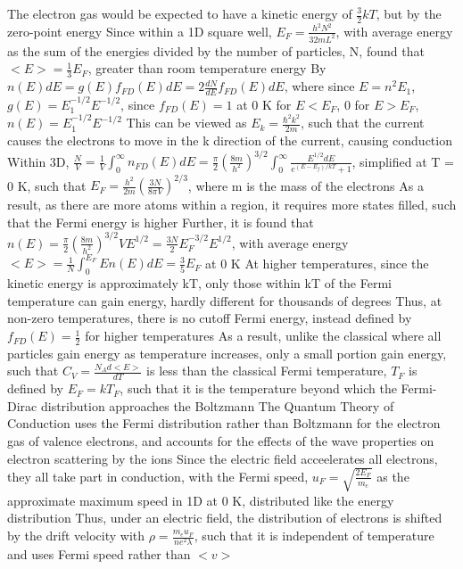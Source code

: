 \documentclass[11 pt, twoside]{article}
\newenvironment{outline*}
{
	\begin{outline}[enumerate]
	}
	{\end{outline}
}
\begin{document}
\begin{outline*}
\1 The electron gas would be expected to have a kinetic energy of $\frac{3}{2}kT$, but by the zero-point energy
	\2 Since within a 1D square well, $E_F = \frac{h^2N^2}{32mL^2}$, with average energy as the sum of the energies divided by the number of particles, N, found that $<E> = \frac{1}{3}E_F$, greater than room temperature energy
		\3 By $n(E)dE = g(E)f_{FD}(E)dE = 2\frac{dN}{dE}f_{FD}(E)dE$, where since $E = n^2E_1$, $g(E) = E_1^{-1/2}E^{-1/2}$, since $f_{FD}(E) = 1$ at 0 K for $E < E_F$, 0 for $E > E_F$, $n(E) = E_1^{-1/2}E^{-1/2}$
		\3 This can be viewed as $E_k = \frac{\hbar^2k^2}{2m}$, such that the current causes the electrons to move in the k direction of the current, causing conduction
	\2 Within 3D, $\frac{N}{V} = \frac{1}{V}\int^{\infty}_0 n_{FD}(E)dE = \frac{\pi}{2}(\frac{8m}{h^2})^{3/2}\int^{\infty}_0 \frac{E^{1/2}dE}{e^{(E - E_f)/kT} + 1}$, simplified at T = 0 K, such that $E_F = \frac{h^2}{2m}(\frac{3N}{8\pi V})^{2/3}$, where m is the mass of the electrons
		\3 As a result, as there are more atoms within a region, it requires more states filled, such that the Fermi energy is higher
		\3 Further, it is found that $n(E) = \frac{\pi}{2}(\frac{8m}{h^2})^{3/2}VE^{1/2} = \frac{3N}{2}E_F^{-3/2}E^{1/2}$, with average energy $<E> = \frac{1}{N}\int^{E_F}_0 En(E)dE = \frac{3}{5}E_F$ at 0 K
			\4 At higher temperatures, since the kinetic energy is approximately kT, only those within kT of the Fermi temperature can gain energy, hardly different for thousands of degrees
			\4 Thus, at non-zero temperatures, there is no cutoff Fermi energy, instead defined by $f_{FD}(E) = \frac{1}{2}$ for higher temperatures
			\4 As a result, unlike the classical where all particles gain energy as temperature increases, only a small portion gain energy, such that $C_V = \frac{N_Ad<E>}{dT}$ is less than the classical
	\2 Fermi temperature, $T_F$ is defined by $E_F = kT_F$, such that it is the temperature beyond which the Fermi-Dirac distribution approaches the Boltzmann
\1 The Quantum Theory of Conduction uses the Fermi distribution rather than Boltzmann for the electron gas of valence electrons, and accounts for the effects of the wave properties on electron scattering by the ions
	\2 Since the electric field acceelerates all electrons, they all take part in conduction, with the Fermi speed, $u_F = \sqrt{\frac{2E_F}{m_e}}$ as the approximate maximum speed in 1D at 0 K, distributed like the energy distribution
		\3 Thus, under an electric field, the distribution of electrons is shifted by the drift velocity with $\rho = \frac{m_eu_F}{ne^2\lambda}$, such that it is independent of temperature and uses Fermi speed rather than $<v>$

\end{outline*}
\end{document}
